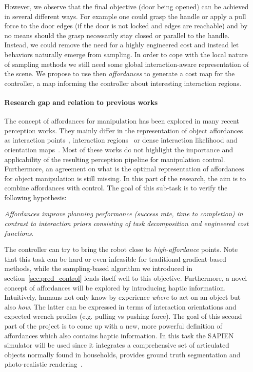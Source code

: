 However, we observe that the final objective (door being opened) can be achieved in several different ways. For example one could grasp the handle or apply a pull force to the door edges (if the door is not locked and edges are reachable) and by no means should the grasp necessarily stay closed or parallel to the handle. Instead, we could remove the need for a highly engineered cost and instead let behaviors naturally emerge from sampling. In order to cope with the local nature of sampling methods we still need some global interaction-aware representation of the scene. We propose to use then \emph{affordances} to generate a cost map for the controller, a map informing the controller about interesting interaction regions.

\paragraph{Research gap and relation to previous works} The concept of affordances for manipulation has been explored in many recent perception works. They mainly differ in the representation of object affordances as interaction points~\cite{gao2021kpam}, interaction regions~\cite{nagarajan2019grounded} or dense interaction likelihood and orientation maps~\cite{mo2021where2act}. Most of these works do not highlight the importance and applicability of the resulting perception pipeline for manipulation control. Furthermore, an agreement on what is the optimal representation of affordances for object manipulation is still missing. In this part of the research, the aim is to combine affordances with control. The goal of this sub-task is to verify the following hypothesis:
\begin{displayquote}
\textit{Affordances improve planning performance (success rate, time to completion) in contrast to interaction priors consisting of task decomposition and engineered cost functions.}
\end{displayquote}
The controller can try to bring the robot close to \emph{high-affordance} points. Note that this task can be hard or even infeasible for traditional gradient-based methods, while the sampling-based algorithm we introduced in section~\ref{sec:pred_control} lends itself well to this objective. 
Furthermore, a novel concept of affordances will be explored by introducing haptic information. Intuitively, humans not only know by experience \emph{where} to act on an object but also \emph{how}. The latter can be expressed in terms of interaction orientations and expected wrench profiles (e.g. pulling vs pushing force). The goal of this second part of the project is to come up with a new, more powerful definition of affordances which also contains haptic information. In this task the SAPIEN simulator will be used since it integrates a comprehensive set of articulated objects normally found in households, provides ground truth segmentation and photo-realistic rendering~\cite{Xiang_2020_SAPIEN}. 

